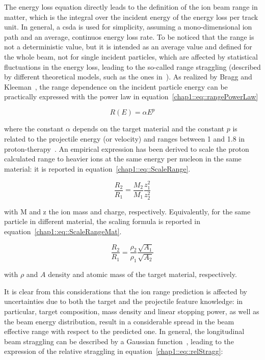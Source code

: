 The energy loss equation directly leads to the definition of the ion beam range in matter, which is the integral over the incident energy of the energy loss per track unit. In general, a \gls{csda} is used for simplicity, assuming a mono-dimensional ion path and an average, continuos energy loss rate. To be noticed that the range is not a deterministic value, but it is intended as an average value and defined for the whole beam, not for single incident particles, which are affected by statistical fluctuations in the energy loss, leading to the so-called range straggling (described by different theoretical models, such as the ones in~\cite{Bohr1915, Landau1944, Vavilov1957}). As realized by Bragg and Kleeman~\parencite{Bragg1905}, the range dependence on the incident particle energy can be practically expressed with the power law in equation~\ref{chap1::eq::rangePowerLaw}

\begin{equation}
R(E) = \alpha E^{p}
\label{chap1::eq::rangePowerLaw}
\end{equation}

where the constant $\alpha$ depends on the target material and the constant $p$ is related to the projectile energy (or velocity) and ranges between 1 and 1.8 in proton-therapy~\parencite{Durante2016}. An empirical expression has been derived to scale the proton calculated range to heavier ions at the same energy per nucleon in the same material: it is reported in equation~\ref{chap1::eq::ScaleRange}.

\begin{equation}
\frac{R_{2}}{R_{1}} = \frac{M_{2}}{M_{1}}\frac{z_{1}^{2}}{z_{2}^{2}}
\label{chap1::eq::ScaleRange}
\end{equation}

with M and z the ion mass and charge, respectively. Equivalently, for the same particle in different material, the scaling formula is reported in equation~\ref{chap1::eq::ScaleRangeMat}.

\begin{equation}
\frac{R_{2}}{R_{1}} = \frac{\rho_{2}}{\rho_{1}}\frac{\sqrt{A_{1}}}{\sqrt{A_{2}}}
\label{chap1::eq::ScaleRangeMat}
\end{equation}
 
 with $\rho$ and $A$ density and atomic mass of the target material, respectively.
 
 It is clear from this considerations that the ion range prediction is affected by uncertainties due to both the target and the projectile feature knowledge: in particular, target composition, mass density and linear stopping power, as well as the beam energy distribution, result in a considerable spread in the beam effective range with respect to the predicted one. In general, the longitudinal beam straggling can be described by a Gaussian function~\parencite{Vavilov1957}, leading to the expression of the relative straggling in equation~\ref{chap1::eq::relStragg}:
 

